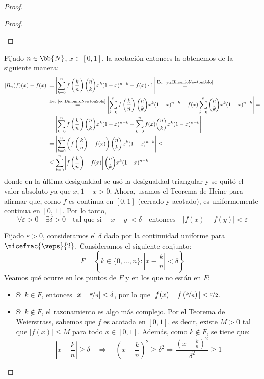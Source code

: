 \begin{proof}
\begin{lema}
\begin{proof}
\begin{enumerate}
            \end{enumerate}
        \end{proof}
    \end{lema}


    Fijado $n\in \bb{N}$, $x\in [0,1]$, la acotación entonces la obtenemos de la siguiente manera:
    \begin{align*}
        \left| B_n(f)(x) - f(x) \right|
        &= \left| \sum_{k=0}^n f\left(\frac{k}{n}\right)\binom{n}{k} x^k(1-x)^{n-k} - f(x)\cdot 1 \right| \stackrel{\text{Ec. \ref{eq:BinomioNewtonSolo}}}{=}\\
        &\stackrel{\text{Ec. \ref{eq:BinomioNewtonSolo}}}{=} \left| \sum_{k=0}^n f\left(\frac{k}{n}\right)\binom{n}{k} x^k(1-x)^{n-k} - f(x)\sum_{k=0}^n \binom{n}{k} x^k(1-x)^{n-k} \right| =\\
        &= \left| \sum_{k=0}^n f\left(\frac{k}{n}\right)\binom{n}{k} x^k(1-x)^{n-k} - \sum_{k=0}^n f(x)\binom{n}{k} x^k(1-x)^{n-k} \right| =\\
        &= \left| \sum_{k=0}^n \left( f\left(\frac{k}{n}\right) - f(x) \right)\binom{n}{k} x^k(1-x)^{n-k} \right| \leq\\
        &\leq \sum_{k=0}^n \left| f\left(\frac{k}{n}\right) - f(x) \right|\binom{n}{k} x^k(1-x)^{n-k}
    \end{align*}
    donde en la última desigualdad se usó la desigualdad triangular y se quitó el valor absoluto ya que $x,1-x>0$. Ahora, usamos el Teorema de Heine
    para afirmar que, como $f$ es continua en $[0,1]$ (cerrado y acotado), es uniformemente continua en $[0,1]$. Por lo tanto,
    \begin{equation*}
        \forall \varepsilon>0\quad \exists \delta>0\quad \text{tal que si}\quad |x-y|<\delta\quad \text{entonces}\quad |f(x)-f(y)|<\varepsilon
    \end{equation*}

    Fijado $\varepsilon>0$, consideramos el $\delta$ dado por la continuidad uniforme para $\nicefrac{\veps}{2}$.
    Consideramos el siguiente conjunto:
    \begin{equation*}
        F = \left\{ k\in \{0,\dots,n\} : \left|x-\frac{k}{n}\right|<\delta \right\}
    \end{equation*}
    Veamos qué ocurre en los puntos de $F$ y en los que no están en $F$:
    \begin{itemize}
        \item Si $k\in F$, entonces $\left|x-\nicefrac{k}{n}\right|<\delta$, por lo que $|f(x)-f\left(\nicefrac{k}{n}\right)|<\nicefrac{\varepsilon}{2}$.
        \item Si $k\notin F$, el razonamiento es algo más complejo. Por el Teorema de Weierstrass,
        sabemos que $f$ es acotada en $[0,1]$, es decir, existe $M>0$ tal que $|f(x)|\leq M$ para todo $x\in [0,1]$.
        Además, como $k\notin F$, se tiene que:
        \begin{equation*}
            \left|x-\frac{k}{n}\right|\geq\delta\quad \Longrightarrow\quad \left(x-\frac{k}{n}\right)^2\geq\delta^2
            \Longrightarrow \dfrac{\left(x-\frac{k}{n}\right)^2}{\delta^2}\geq 1
        \end{equation*}


\end{itemize}
\end{proof}
